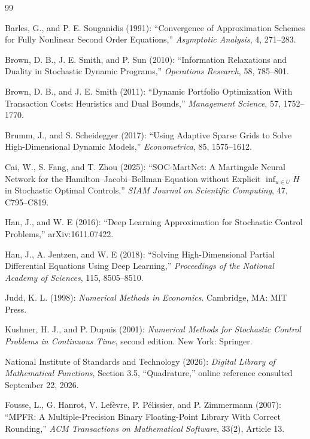 \begin{thebibliography}{99}

Barles, G., and P. E. Souganidis (1991): ``Convergence of Approximation Schemes for Fully Nonlinear Second Order Equations,'' \emph{Asymptotic Analysis}, 4, 271--283.

Brown, D. B., J. E. Smith, and P. Sun (2010): ``Information Relaxations and Duality in Stochastic Dynamic Programs,'' \emph{Operations Research}, 58, 785--801.

Brown, D. B., and J. E. Smith (2011): ``Dynamic Portfolio Optimization With Transaction Costs: Heuristics and Dual Bounds,'' \emph{Management Science}, 57, 1752--1770.

Brumm, J., and S. Scheidegger (2017): ``Using Adaptive Sparse Grids to Solve High-Dimensional Dynamic Models,'' \emph{Econometrica}, 85, 1575--1612.

Cai, W., S. Fang, and T. Zhou (2025): ``SOC-MartNet: A Martingale Neural Network for the Hamilton--Jacobi--Bellman Equation without Explicit $\inf_{u\in U}H$ in Stochastic Optimal Controls,'' \emph{SIAM Journal on Scientific Computing}, 47, C795--C819.

Han, J., and W. E (2016): ``Deep Learning Approximation for Stochastic Control Problems,'' arXiv:1611.07422.

Han, J., A. Jentzen, and W. E (2018): ``Solving High-Dimensional Partial Differential Equations Using Deep Learning,'' \emph{Proceedings of the National Academy of Sciences}, 115, 8505--8510.

Judd, K. L. (1998): \emph{Numerical Methods in Economics}. Cambridge, MA: MIT Press.

Kushner, H. J., and P. Dupuis (2001): \emph{Numerical Methods for Stochastic Control Problems in Continuous Time}, second edition. New York: Springer.

National Institute of Standards and Technology (2026): \emph{Digital Library of Mathematical Functions}, Section 3.5, ``Quadrature,'' online reference consulted September 22, 2026.

Fousse, L., G. Hanrot, V. Lef\`evre, P. P\'elissier, and P. Zimmermann (2007): ``MPFR: A Multiple-Precision Binary Floating-Point Library With Correct Rounding,'' \emph{ACM Transactions on Mathematical Software}, 33(2), Article 13.

\end{thebibliography}
